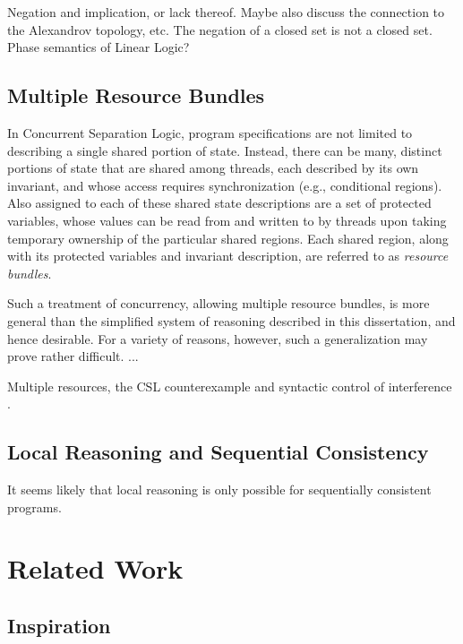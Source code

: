 \documentclass[11pt]{report}
\begin{document}
Negation and implication, or lack thereof. Maybe also discuss the connection to the Alexandrov topology, etc. The negation of a closed set is not a closed set. Phase semantics of Linear Logic? 

\section{Multiple Resource Bundles}

In Concurrent Separation Logic, program specifications are not limited to describing a single shared portion of state. Instead, there can be many, distinct portions of state that are shared among threads, each described by its own invariant, and whose access requires synchronization (e.g., conditional regions). Also assigned to each of these shared state descriptions are a set of protected variables, whose values can be read from and written to by threads upon taking temporary ownership of the particular shared regions. Each shared region, along with its protected variables and invariant description, are referred to as \emph{resource bundles}. 

Such a treatment of concurrency, allowing multiple resource bundles, is more general than the simplified system of reasoning described in this dissertation, and hence desirable. For a variety of reasons, however, such a generalization may prove rather difficult. ... 

Multiple resources, the CSL counterexample \cite{Brookes20115} and syntactic control of interference \cite{DBLP:conf/popl/ReddyR12}.  

\section{Local Reasoning and Sequential Consistency}

It seems likely that local reasoning is only possible for sequentially consistent programs. 

\chapter{Related Work}

\section{Inspiration}
\end{document}
